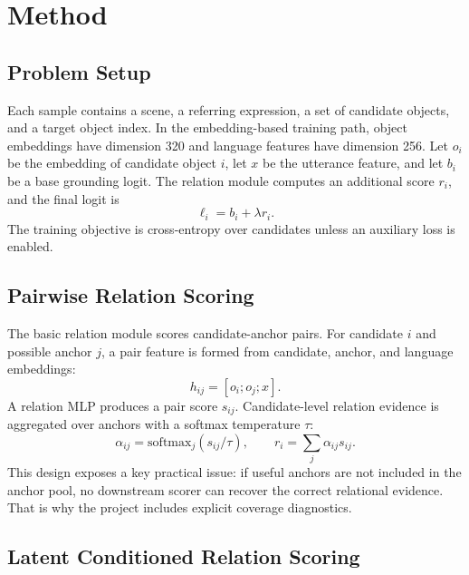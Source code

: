 \section{Method}

\subsection{Problem Setup}

Each sample contains a scene, a referring expression, a set of candidate objects, and a target object index. In the embedding-based training path, object embeddings have dimension 320 and language features have dimension 256. Let $o_i$ be the embedding of candidate object $i$, let $x$ be the utterance feature, and let $b_i$ be a base grounding logit. The relation module computes an additional score $r_i$, and the final logit is
\begin{equation}
  \ell_i = b_i + \lambda r_i .
  \label{eq:fusion}
\end{equation}
The training objective is cross-entropy over candidates unless an auxiliary loss is enabled.

\subsection{Pairwise Relation Scoring}

The basic relation module scores candidate-anchor pairs. For candidate $i$ and possible anchor $j$, a pair feature is formed from candidate, anchor, and language embeddings:
\begin{equation}
  h_{ij} = [o_i; o_j; x].
\end{equation}
A relation MLP produces a pair score $s_{ij}$. Candidate-level relation evidence is aggregated over anchors with a softmax temperature $\tau$:
\begin{equation}
  \alpha_{ij} = \mathrm{softmax}_{j}(s_{ij}/\tau),
  \qquad
  r_i = \sum_j \alpha_{ij}s_{ij}.
  \label{eq:anchor-aggregation}
\end{equation}
This design exposes a key practical issue: if useful anchors are not included in the anchor pool, no downstream scorer can recover the correct relational evidence. That is why the project includes explicit coverage diagnostics.

\subsection{Latent Conditioned Relation Scoring}

